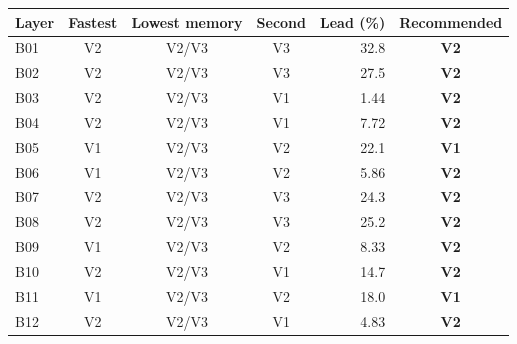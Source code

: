 \begin{tabular}{lcccrc}
\hline
\rowcolor{headgrey}
\textbf{Layer} & \textbf{Fastest} & \textbf{Lowest memory} & \textbf{Second} & \textbf{Lead (\%)} & \textbf{Recommended} \\ \hline
B01 & V2 & V2/V3 & V3 & 32.8 & \textbf{V2} \\
B02 & V2 & V2/V3 & V3 & 27.5 & \textbf{V2} \\
B03 & V2 & V2/V3 & V1 & 1.44 & \textbf{V2} \\
B04 & V2 & V2/V3 & V1 & 7.72 & \textbf{V2} \\
B05 & V1 & V2/V3 & V2 & 22.1 & \textbf{V1} \\
B06 & V1 & V2/V3 & V2 & 5.86 & \textbf{V2} \\
B07 & V2 & V2/V3 & V3 & 24.3 & \textbf{V2} \\
B08 & V2 & V2/V3 & V3 & 25.2 & \textbf{V2} \\
B09 & V1 & V2/V3 & V2 & 8.33 & \textbf{V2} \\
B10 & V2 & V2/V3 & V1 & 14.7 & \textbf{V2} \\
B11 & V1 & V2/V3 & V2 & 18.0 & \textbf{V1} \\
B12 & V2 & V2/V3 & V1 & 4.83 & \textbf{V2} \\
\hline
\end{tabular}
